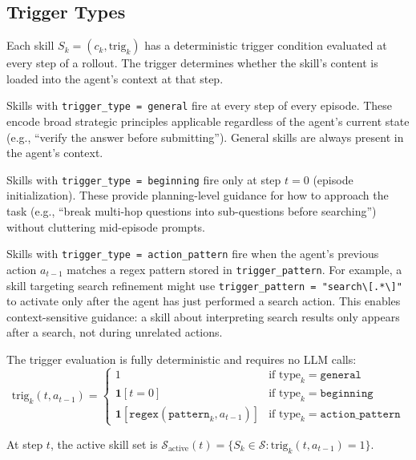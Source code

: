\documentclass{article}
\theoremstyle{plain}
\theoremstyle{definition}
\theoremstyle{remark}
\begin{document}
\subsection{Trigger Types}

Each skill $S_k = (c_k, \text{trig}_k)$ has a deterministic trigger condition evaluated at every step of a rollout. The trigger determines whether the skill's content is loaded into the agent's context at that step.

Skills with \texttt{trigger\_type = general} fire at every step of every episode. These encode broad strategic principles applicable regardless of the agent's current state (e.g., ``verify the answer before submitting''). General skills are always present in the agent's context.

Skills with \texttt{trigger\_type = beginning} fire only at step $t = 0$ (episode initialization). These provide planning-level guidance for how to approach the task (e.g., ``break multi-hop questions into sub-questions before searching'') without cluttering mid-episode prompts.

Skills with \texttt{trigger\_type = action\_pattern} fire when the agent's previous action $a_{t-1}$ matches a regex pattern stored in \texttt{trigger\_pattern}. For example, a skill targeting search refinement might use \texttt{trigger\_pattern = "search\textbackslash[.*\textbackslash]"} to activate only after the agent has just performed a search action. This enables context-sensitive guidance: a skill about interpreting search results only appears after a search, not during unrelated actions.

The trigger evaluation is fully deterministic and requires no LLM calls:
\begin{equation}
    \text{trig}_k(t, a_{t-1}) = \begin{cases}
        1 & \text{if type}_k = \texttt{general} \\
        \mathbf{1}[t = 0] & \text{if type}_k = \texttt{beginning} \\
        \mathbf{1}[\texttt{regex}(\texttt{pattern}_k, a_{t-1})] & \text{if type}_k = \texttt{action\_pattern}
    \end{cases}
\end{equation}

At step $t$, the active skill set is $\mathcal{S}_{\text{active}}(t) = \{S_k \in \mathcal{S} : \text{trig}_k(t, a_{t-1}) = 1\}$.
\end{document}
